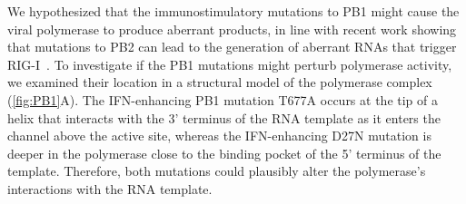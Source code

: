 \documentclass[]{asm-article}
\newcommand{\FIG}[1]{\autoref{fig:#1}}
\begin{document}
We hypothesized that the immunostimulatory mutations to PB1 might cause the viral polymerase to produce aberrant products, in line with recent work showing that mutations to PB2 can lead to the generation of aberrant RNAs that trigger RIG-I~\cite{velthuis2018mini, du2018genome}.
To investigate if the PB1 mutations might perturb polymerase activity, we examined their location in a structural model of the polymerase complex (\FIG{PB1}A).
The IFN-enhancing PB1 mutation T677A occurs at the tip of a helix that interacts with the 3' terminus of the RNA template as it enters the channel above the active site, whereas the IFN-enhancing D27N mutation is deeper in the polymerase close to the binding pocket of the 5' terminus of the template. 
Therefore, both mutations could plausibly alter the polymerase's interactions with the RNA template.
\end{document}
